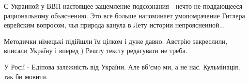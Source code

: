  
 
 
 
 
\zzSecCmt

\begin{itemize} %

С Украиной у ВВП настоящее защемление подсознания - нечто не поддающееся
рациональному объяснению. Это все больше напоминает умопомрачение Гитлера
еврейским вопросом, чья природа канула в Лету истории непроясненной...


Методички німецькі підійшли їм цілком і дуже давно. Австрію закреслили, вписали
Україну і вперед ) Решту тексту редагувати не треба.


У Росії - Едіпова залежність від України. Але вб'ємо ми, а не нас. Кульмінація,
так би мовити.
\end{itemize} %
